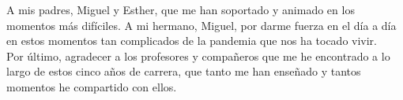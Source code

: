 A mis padres, Miguel y Esther, que me han soportado y animado en los momentos más difíciles. A mi hermano, Miguel, por darme fuerza en el día a día en estos momentos tan complicados de la pandemia que nos ha tocado vivir.\\

Por último, agradecer a los profesores y compañeros que me he encontrado a lo largo de estos cinco años de carrera, que tanto me han enseñado y tantos momentos he compartido con ellos.\\
